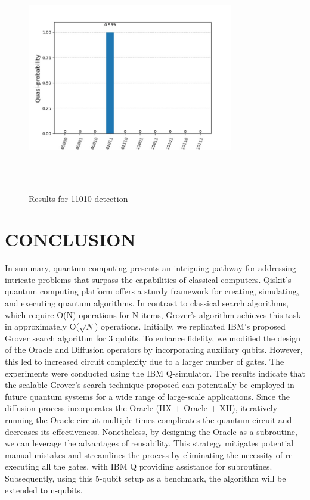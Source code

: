 \documentclass[conference]{IEEEtran}
\begin{document}
\begin{figure}[htbp]
	\centerline{\includegraphics[width=9cm,height=10cm,keepaspectratio]{5_qubit.png}}
	\caption{Results for 11010 detection}
	\label{fig:5_qubit}
\end{figure}


\section{CONCLUSION}
In summary, quantum computing presents an intriguing
pathway for addressing intricate problems that surpass the capabilities of classical computers. Qiskit’s quantum computing
platform offers a sturdy framework for creating, simulating,
and executing quantum algorithms. In contrast to classical
search algorithms, which require O(N) operations for N
items, Grover’s algorithm achieves this task in approximately
O($\sqrt{N} $) operations. Initially, we replicated IBM’s proposed
Grover search algorithm for 3 qubits. To enhance fidelity, we
modified the design of the Oracle and Diffusion operators by
incorporating auxiliary qubits. However, this led to increased
circuit complexity due to a larger number of gates. The
experiments were conducted using the IBM Q-simulator. The
results indicate that the scalable Grover’s search technique
proposed can potentially be employed in future quantum
systems for a wide range of large-scale applications. Since
the diffusion process incorporates the Oracle (HX + Oracle +
XH), iteratively running the Oracle circuit multiple times complicates the quantum circuit and decreases its effectiveness.
Nonetheless, by designing the Oracle as a subroutine, we can
leverage the advantages of reusability. This strategy mitigates
potential manual mistakes and streamlines the process by
eliminating the necessity of re-executing all the gates, with
IBM Q providing assistance for subroutines. Subsequently,
using this 5-qubit setup as a benchmark, the algorithm will
be extended to n-qubits.
\end{document}
